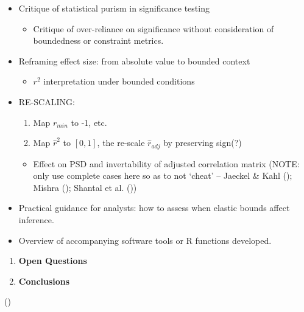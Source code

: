 \documentclass[
  12pt,
]{article}
\providecommand{\tightlist}{%
  \setlength{\itemsep}{0pt}\setlength{\parskip}{0pt}}\usepackage{longtable,booktabs,array}
\theoremstyle{plain}
\theoremstyle{definition}
\theoremstyle{remark}
\begin{document}
\begin{itemize}
\tightlist
\item
  Critique of statistical purism in significance testing

  \begin{itemize}
  \tightlist
  \item
    Critique of over-reliance on significance without consideration of
    boundedness or constraint metrics.
  \end{itemize}
\item
  Reframing effect size: from absolute value to bounded context

  \begin{itemize}
  \tightlist
  \item
    \(r^2\) interpretation under bounded conditions
  \end{itemize}
\item
  RE-SCALING:

  \begin{enumerate}
  \def\labelenumi{\arabic{enumi}.}
  \tightlist
  \item
    Map \(r_{min}\) to -1, etc.
  \item
    Map \(\hat{r}^2\) to \([0,1]\), the re-scale \(\hat{r}_{adj}\) by
    preserving sign(?)
  \end{enumerate}

  \begin{itemize}
  \tightlist
  \item
    Effect on PSD and invertability of adjusted correlation matrix
    (NOTE: only use complete cases here so as to not `cheat' -- Jaeckel
    \& Kahl (); Mishra
    (); Shantal et al.
    ())
  \end{itemize}
\item
  Practical guidance for analysts: how to assess when elastic bounds
  affect inference.
\item
  Overview of accompanying software tools or R functions developed.
\end{itemize}

\begin{enumerate}
\def\labelenumi{\arabic{enumi}.}
\setcounter{enumi}{6}
\item
  \textbf{Open Questions}
\item
  \textbf{Conclusions}
\end{enumerate}

()
\end{document}
